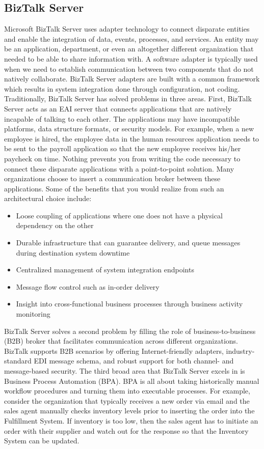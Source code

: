 \documentclass[12pt,a4paper,final,twoside,onecolumn,titlepage]{book}
\begin{document}
\subsection{BizTalk Server}
Microsoft BizTalk Server uses adapter technology to connect disparate entities and enable the integration of data, events, processes, and services. An entity may be an application, department, or even an altogether different organization that needed to be able to share information with. A software adapter is typically used when we need to establish communication between two components that do not natively collaborate. BizTalk Server adapters are built with a common framework which results in system integration done through configuration, not coding. Traditionally, BizTalk Server has solved problems in three areas. First, BizTalk Server acts as an \gls{EAI} server that connects applications that are natively incapable of talking to each other. The applications may have incompatible platforms, data structure formats, or security models. For example, when a new employee is hired, the employee data in the human resources application needs to be sent to the payroll application so that the new employee receives his/her paycheck on time. Nothing prevents you from writing the code necessary to connect these disparate applications with a point-to-point solution. Many organizations choose to insert a communication broker between these applications. Some of the benefits that you would realize from such an architectural choice include:
\begin{itemize}
\item Loose coupling of applications where one does not have a physical dependency on the other
\item Durable infrastructure that can guarantee delivery, and queue messages during destination system downtime
\item Centralized management of system integration endpoints
\item Message flow control such as in-order delivery
\item Insight into cross-functional business processes through business activity monitoring
\end{itemize}
BizTalk Server solves a second problem by filling the role of business-to-business (B2B) broker that facilitates communication across different organizations. BizTalk supports B2B scenarios by offering Internet-friendly adapters, industry-standard EDI message schema, and robust support for both channel- and message-based security.
The third broad area that BizTalk Server excels in is Business Process Automation (BPA). BPA is all about taking historically manual workflow procedures and turning them into executable processes. For example, consider the organization that typically receives a new order via email and the sales agent manually checks inventory levels prior to inserting the order into the Fulfillment System. If inventory is too low, then the sales agent has to initiate an order with their supplier and watch out for the response so that the Inventory System can be updated. 
\end{document}
